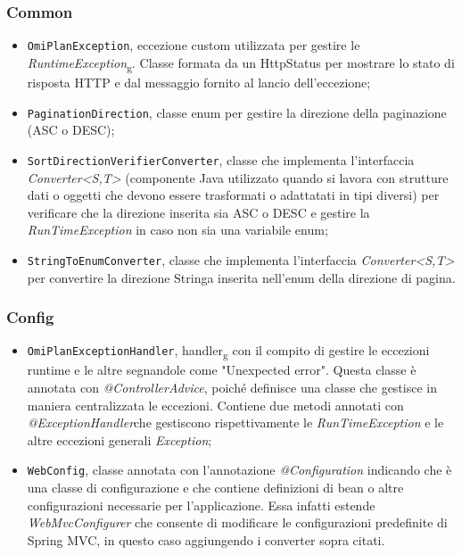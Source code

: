 \subsubsection*{Common}
\begin{itemize}
\item \texttt{OmiPlanException}, eccezione custom utilizzata per gestire le \textit{RuntimeException}\textsubscript{g}. Classe formata da un HttpStatus per mostrare lo stato di risposta HTTP e dal messaggio fornito al lancio dell'eccezione;
\item \texttt{PaginationDirection}, classe enum per gestire la direzione della paginazione (ASC o DESC);
\item \texttt{SortDirectionVerifierConverter}, classe che implementa l'interfaccia \textit{Converter<S,T>} (componente Java utilizzato quando si lavora con strutture dati o oggetti che devono essere trasformati o adattatati in tipi diversi) per verificare che la direzione inserita sia ASC o DESC e gestire la \textit{RunTimeException} in caso non sia una variabile enum;
\item \texttt{StringToEnumConverter}, classe che implementa l'interfaccia \textit{Converter<S,T>} per convertire la direzione Stringa inserita nell'enum della direzione di pagina.
\end{itemize}

\subsubsection*{Config}
\begin{itemize}
\item \texttt{OmiPlanExceptionHandler}, handler\textsubscript{g} con il compito di gestire le eccezioni runtime e le altre segnandole come "Unexpected error". Questa classe è annotata con \textit{@ControllerAdvice}, poiché definisce una classe che gestisce in maniera centralizzata le eccezioni. Contiene due metodi annotati con \textit{@ExceptionHandler}che gestiscono rispettivamente le \textit{RunTimeException} e le altre eccezioni generali \textit{Exception};
\item \texttt{WebConfig}, classe annotata con l'annotazione \textit{@Configuration} indicando che è una classe di configurazione e che contiene definizioni di bean o altre configurazioni necessarie per l'applicazione. Essa infatti estende \textit{WebMvcConfigurer} che consente di modificare le configurazioni predefinite di Spring MVC, in questo caso aggiungendo i converter sopra citati.
\end{itemize}